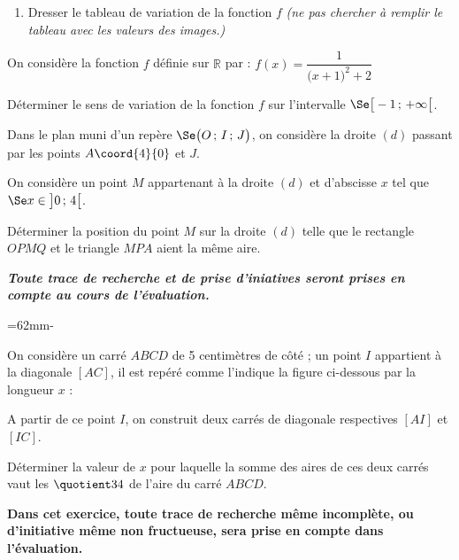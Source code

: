 \documentclass{book}
\begin{document}
\begin{multicols*}{2}
\begin{enumerate}
\item Dresser le tableau de variation de la fonction $f$ {\it(ne pas chercher \`a remplir le tableau avec les valeurs des images.)}
\end{enumerate}

\leavevmode\exercice


On consid\`ere la fonction $f$ d\'efinie sur $\mathbb{R}$ par :\newline
\hglue\leftmargini$f(x)=\dfrac1{\big(x+1)^2+2}$

D\'eterminer le sens de variation de la fonction $f$ sur l'intervalle $\Se\big[-1\,;\,+\infty\big[$.

\leavevmode\exercice


Dans le plan muni d'un rep\`ere $\Se\big(O\,;\,I\,;\,J\big)$, on consid\`ere la droite $(d)$ passant par les points $A\coord{4}{0}$ et $J$.

\leavevmode\hfil\hbox{}

On consid\`ere un point $M$ appartenant \`a la droite $(d)$ et d'abscisse $x$ tel que $\Se x\in\big]0\,;\,4\big[$.

D\'eterminer la position du point $M$ sur la droite $(d)$ telle que le rectangle $OPMQ$ et le triangle $MPA$ aient la m\^eme aire.

{\sl\bfseries Toute trace de recherche et de prise d'iniatives seront prises en compte au cours de l'\'evaluation.}

\leavevmode\exercice


=62mm\hsize\advance{}-
\begin{minipage}[t]{\dimen1}
\leavevmode{}\hbox{}\hfill
\end{minipage}
\begin{minipage}[t]{\dimen0}
On consid\`ere un carr\'e $ABCD$ de 5 centim\`etres de c\^ot\'e ; un point $I$ appartient \`a la diagonale $[AC]$, il est rep\'er\'e comme l'indique la figure ci-dessous par la longueur $x$ :

\vskip0.2cm
A partir de ce point $I$, on construit deux carr\'es de diagonale respectives $[AI]$ et $[IC]$.
\end{minipage}

D\'eterminer la valeur de $x$ pour laquelle la somme des aires de ces deux carr\'es vaut les $\quotient34$ de l'aire du carr\'e $ABCD$.

\leavevmode\exercice


{\bf Dans cet exercice, toute trace de recherche m\^eme incompl\`ete, ou d'initiative m\^eme non fructueuse, sera prise en compte dans l'\'evaluation.}


\end{multicols*}
\end{document}

